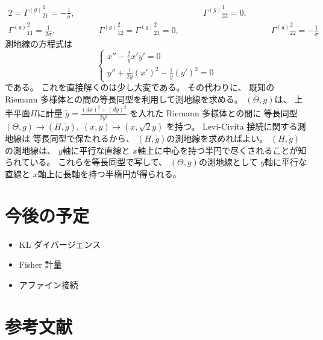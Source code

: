 \documentclass[report]{jlreq}
\begin{document}
\begin{example}[正規分布族]
\begin{alignat}{2}
                    = {\Gamma^{(g)}}_{21}^1
                    = -\frac{1}{\sigma},
            &&\qquad
                {\Gamma^{(g)}}_{22}^1
                    = 0,
            \\
        {\Gamma^{(g)}}_{11}^2
            = \frac{1}{2\sigma},
            &\qquad
                {\Gamma^{(g)}}_{12}^2
                    = {\Gamma^{(g)}}_{21}^2
                    = 0,
            &&\qquad
                {\Gamma^{(g)}}_{22}^2
                    = -\frac{1}{\sigma}
    \end{alignat}
    測地線の方程式は
    \begin{equation}
        \begin{cases}
            x'' - \frac{2}{y} x' y' = 0 \\
            y'' + \frac{1}{2y} (x')^2 - \frac{1}{y} (y')^2 = 0
        \end{cases}
    \end{equation}
    である。
    これを直接解くのは少し大変である。
    その代わりに、
    既知の Riemann 多様体との間の等長同型を利用して測地線を求める。
    $(\Theta, g)$は、
    上半平面$H$に計量
    $\breve{g} = \frac{(dx)^2 + (dy)^2}{2y^2}$
    を入れた Riemann 多様体との間に
    等長同型$(\Theta, g) \to (H, \breve{g}), \;
        (x, y) \mapsto (x, \sqrt{2}y)$
    を持つ。
    Levi-Civita 接続に関する測地線は
    等長同型で保たれるから、
    $(H, \breve{g})$の測地線を求めればよい。
    $(H, \breve{g})$の測地線は、
    $y$軸に平行な直線と
    $x$軸上に中心を持つ半円で尽くされることが知られている。
    これらを等長同型で写して、
    $(\Theta, g)$の測地線として
    $y$軸に平行な直線と
    $x$軸上に長軸を持つ半楕円が得られる。
\end{example}


%
\section{今後の予定}

\begin{itemize}
    \item KL ダイバージェンス
    \item Fisher 計量
    \item アファイン接続
\end{itemize}

%
\section{参考文献}

\nocite{amari_information_2016}

{
    \renewcommand{\bibsection}{}
    
    
}
\end{document}
